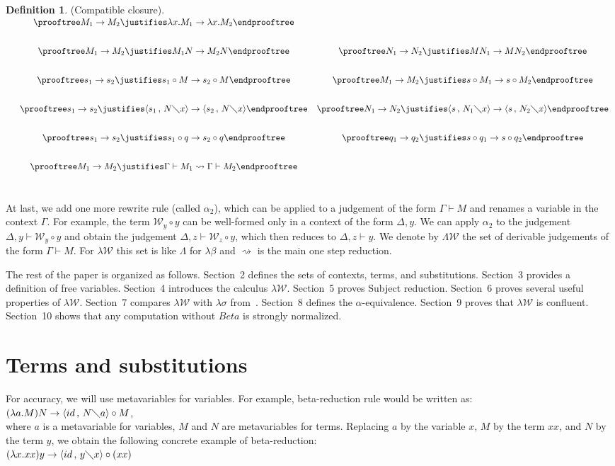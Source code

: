 \documentclass[11pt]{amsart}
\def\ruleone#1#2{\prooftree #1 \justifies #2 \endprooftree}
\theoremstyle{plain}
\theoremstyle{definition}
\newtheorem{definition}[theorem]{Definition}
\theoremstyle{remark}
\numberwithin{equation}{section}
\newcommand{\ci}{\circ}
\newcommand{\ri}{\rightsquigarrow}
\newcommand{\mi}{\,,\,}
\newcommand{\is}{\diagdown}
\newcommand{\arrow}{\rightarrow}
\newcommand{\la}{\langle}
\newcommand{\ra}{\rangle}
\newcommand{\x}{a}
\renewcommand{\pi}{\mathcal{W}}
\begin{document}
\begin{definition}(Compatible closure).\\[10pt]
$
\begin{array}{ccc}
& \ruleone{ M_1\arrow M_2}{ \lambda
x.M_1\arrow\lambda x.M_2}\\[20pt]
& \ruleone{ M_1\arrow M_2}{ M_1N\arrow  M_2N} & \ruleone{
N_1\arrow N_2}{
MN_1\arrow  MN_2}\\[20pt]
& \ruleone{  s_1\arrow s_2}{s_1\ci M\arrow s_2\ci M} & \ruleone{
M_1\arrow
M_2}{s\ci M_1\arrow s\ci M_2}\\[20pt]
& \ruleone{ s_1\arrow s_2}{ \langle s_1\mi N\is x\rangle\arrow
\langle s_2\mi N\is x\rangle} & \ruleone{ N_1\arrow N_2}{ \langle
s\mi N_1\is x\rangle\arrow \langle
s\mi N_2\is x\rangle}\\[20pt]
& \ruleone{ s_1\arrow s_2}{ s_1\ci q\arrow s_2\ci q} & \ruleone{
q_1\arrow q_2}{ s\ci q_1\arrow s\ci
q_2}\\[20pt]
& \ruleone{M_1\arrow M_2}{\Gamma\vdash M_1\ri
\Gamma\vdash M_2}\\[20pt]
\end{array}
$
\end{definition}
At last, we add one more rewrite rule (called $\alpha_2$), which
can be applied to a judgement of the form $\Gamma\vdash M$ and
renames a variable in the context $\Gamma$. For example, the term
$\pi_y\circ y$ can be well-formed only in a context of the form
$\Delta,y$. We can apply $\alpha_2$ to the judgement
$\Delta,y\vdash \pi_y\circ y$ and obtain the judgement
$\Delta,z\vdash\pi_z\circ y$, which then reduces to
$\Delta,z\vdash y$. We denote by $\Lambda\pi$ the set of derivable
 judgements of the form $\Gamma\vdash M$. For $\lambda\pi$ this set  is like
$\Lambda$ for $\lambda\beta$ and $\ri$ is the main one step
reduction.

The rest of the paper is organized as follows. Section~2 defines
the sets of contexts, terms, and substitutions. Section~3 provides
a definition of free variables. Section~4 introduces the calculus
$\lambda\pi$.  Section~5  proves Subject reduction.  Section~6
proves several useful properties of $\lambda\pi$. Section~7
compares $\lambda\pi$ with $\lambda\sigma$ from~\cite{Abadi}.
Section~8 defines the $\alpha$-equivalence. Section~9 proves that
$\lambda\pi$ is confluent. Section~10 shows that any computation
without $Beta$ is strongly normalized.
\newpage



\section{Terms and substitutions}
For accuracy, we will use metavariables for variables. For
example, beta-reduction rule would be written as:\\
$(\lambda \x.M)N\arrow\la id\mi N\is \x\ra\ci M$,\\
where $\x$ is a metavariable for variables, $M$ and $N$ are
metavariables for terms. Replacing $\x$ by the variable $x$, $M$
by the term $xx$, and $N$ by the term $y$, we obtain the following
concrete example of beta-reduction:\\
$(\lambda x.xx)y\arrow\la id\mi y\is x\ra\ci (xx)$
\end{document}
